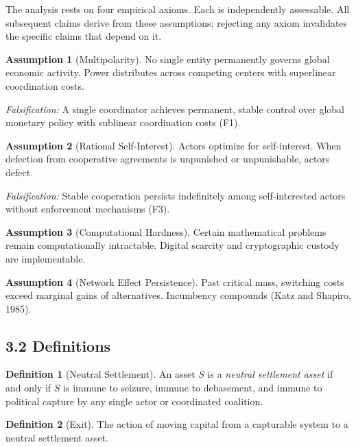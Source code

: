 \documentclass[12pt]{article}
\theoremstyle{definition}
\newtheorem{definition}{Definition}
\newtheorem{assumption}{Assumption}
\theoremstyle{remark}
\begin{document}
The analysis rests on four empirical axioms. Each is independently
assessable. All subsequent claims derive from these assumptions; rejecting
any axiom invalidates the specific claims that depend on it.

\begin{assumption}[Multipolarity]
No single entity permanently governs global economic activity. Power
distributes across competing centers with superlinear coordination costs.
\end{assumption}

\noindent\emph{Falsification:} A single coordinator achieves permanent, stable
control over global monetary policy with sublinear coordination costs (F1).

\begin{assumption}[Rational Self-Interest]
Actors optimize for self-interest. When defection from cooperative
agreements is unpunished or unpunishable, actors defect.
\end{assumption}

\noindent\emph{Falsification:} Stable cooperation persists indefinitely among
self-interested actors without enforcement mechanisms (F3).

\begin{assumption}[Computational Hardness]
Certain mathematical problems remain computationally intractable. Digital
scarcity and cryptographic custody are implementable.
\end{assumption}

\begin{assumption}[Network Effect Persistence]
Past critical mass, switching costs exceed marginal gains of alternatives.
Incumbency compounds (Katz and Shapiro, 1985).
\end{assumption}

\subsection{3.2 Definitions}

\begin{definition}[Neutral Settlement]
An asset $S$ is a \emph{neutral settlement asset} if and only if $S$ is
immune to seizure, immune to debasement, and immune to political capture
by any single actor or coordinated coalition.
\end{definition}

\begin{definition}[Exit]
The action of moving capital from a capturable system to a neutral
settlement asset.
\end{definition}
\end{document}
